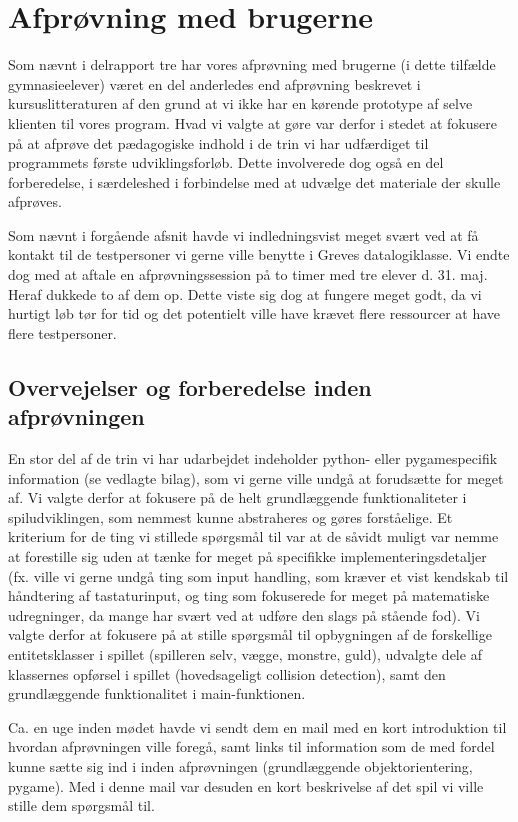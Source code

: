 \documentclass[10pt,a4paper,danish]{article}
\begin{document}
\section{Afprøvning med brugerne}
Som nævnt i delrapport tre har vores afprøvning med brugerne (i dette tilfælde gymnasieelever)
været en del anderledes end afprøvning beskrevet i kursuslitteraturen af den grund at vi ikke 
har en kørende prototype af selve klienten til vores program. Hvad vi valgte at gøre var 
derfor i stedet at fokusere på at afprøve det pædagogiske indhold i de trin vi har udfærdiget
til programmets første udviklingsforløb. Dette involverede dog også en del forberedelse, i 
særdeleshed i forbindelse med at udvælge det materiale der skulle afprøves. 

Som nævnt i forgående afsnit havde vi indledningsvist meget svært ved at få kontakt til de 
testpersoner vi gerne ville benytte i Greves datalogiklasse. Vi endte dog med at aftale en 
afprøvningssession på to timer med tre elever d. 31. maj. Heraf dukkede to af dem op. Dette viste sig dog
at fungere meget godt, da vi hurtigt løb tør for tid og det potentielt ville have krævet flere ressourcer
at have flere testpersoner.

\subsection{Overvejelser og forberedelse inden afprøvningen}
En stor del af de trin vi har udarbejdet indeholder python- eller pygamespecifik information (se vedlagte bilag), som 
vi gerne ville undgå at forudsætte for meget af. Vi valgte derfor at fokusere på de helt 
grundlæggende funktionaliteter i spiludviklingen, som nemmest kunne abstraheres og gøres forståelige.
Et kriterium for de ting vi stillede spørgsmål til var at de såvidt muligt var nemme at
forestille sig uden at tænke for meget på specifikke implementeringsdetaljer (fx. ville vi gerne undgå
ting som input handling, som kræver et vist kendskab til håndtering af tastaturinput, og ting som 
fokuserede for meget på matematiske udregninger, da mange har svært ved at udføre den slags på stående fod). 
Vi valgte derfor at fokusere på at stille spørgsmål til opbygningen af de forskellige entitetsklasser i spillet
(spilleren selv, vægge, monstre, guld), udvalgte dele af klassernes opførsel i spillet (hovedsageligt collision
detection), samt den grundlæggende funktionalitet i main-funktionen. 

Ca. en uge inden mødet havde vi sendt dem en mail med en kort introduktion til hvordan afprøvningen 
ville foregå, samt links til information som de med fordel kunne sætte sig ind i inden afprøvningen 
(grundlæggende objektorientering, pygame). Med i denne mail var desuden en kort beskrivelse af det spil
vi ville stille dem spørgsmål til. 
\end{document}
